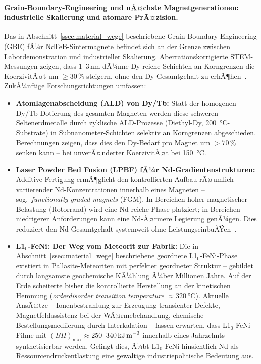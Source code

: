 ﻿\documentclass[12pt, a4paper]{report}
\theoremstyle{definition}
\theoremstyle{remark}
\begin{document}
\paragraph{Grain-Boundary-Engineering und nÃ¤chste Magnetgenerationen:
industrielle Skalierung und atomare PrÃ¤zision.}
Das in Abschnitt~\ref{ssec:material_wege} beschriebene
Grain-Boundary-Engineering (GBE) fÃ¼r NdFeB-Sintermagnete befindet sich
an der Grenze zwischen Labordemonstration und industrieller Skalierung.
Aberrationskorrigierte STEM-Messungen zeigen, dass $1$--$3\,\text{nm}$
dÃ¼nne Dy-reiche Schichten an Korngrenzen die KoerzivitÃ¤t um $\geq 30\,\%$
steigern, ohne den Dy-Gesamtgehalt zu erhÃ¶hen~\cite{sepehriamin2012}.
ZukÃ¼nftige Forschungsrichtungen umfassen:

\begin{itemize}
  \item \textbf{Atomlagenabscheidung (ALD) von Dy/Tb:}
    Statt der homogenen Dy/Tb-Dotierung des gesamten Magneten werden
    diese schweren Seltenerdmetalle durch zyklische
    ALD-Prozesse (Di\-ethyl-Dy, \SI{200}{\celsius}-Substrate) in Subnanometer-Schichten
    selektiv an Korngrenzen abgeschieden. Berechnungen zeigen, dass dies den
    Dy-Bedarf pro Magnet um $>70\,\%$ senken kann -- bei unverÃ¤nderter
    KoerzivitÃ¤t bei \SI{150}{\celsius}.

  \item \textbf{Laser Powder Bed Fusion (LPBF) fÃ¼r Nd-Gradientenstrukturen:}
    Additive Fertigung ermÃ¶glicht den kontrollierten Aufbau rÃ¤umlich
    variierender Nd-Konzentrationen innerhalb eines Magneten -- sog.\
    \emph{functionally graded magnets} (FGM). In Bereichen hoher
    magnetischer Belastung (Rotorrand) wird eine Nd-reiche Phase platziert;
    in Bereichen niedrigerer Anforderungen kann eine Nd-Ã¤rmere Legierung
    genÃ¼gen. Dies reduziert den Nd-Gesamtgehalt systemweit ohne
    LeistungseinbuÃŸen~\cite{nakamura2018}.

  \item \textbf{L1$_0$-FeNi: Der Weg vom Meteorit zur Fabrik:}
    Die in Abschnitt~\ref{ssec:material_wege} beschriebene
    geordnete L1$_0$-FeNi-Phase existiert in Pallasite-Meteoriten mit
    perfekter geordneter Struktur -- gebildet durch langsamste geochemische
    KÃ¼hlung Ã¼ber Millionen Jahre. Auf der Erde scheiterte bisher die
    kontrollierte Herstellung an der kinetischen Hemmung (\emph{orderdisorder
    transition temperature} $\approx \SI{320}{\celsius}$). Aktuelle AnsÃ¤tze --
    Ionenbestrahlung zur Erzeugung transienter Defekte, Magnetfeldassistenz
    bei der WÃ¤rmebehandlung, chemische Bestellungsmediierung durch Interkalation
    -- lassen erwarten, dass L1$_0$-FeNi-Filme mit $(BH)_{\max} \approx
    250$--$340\,\text{kJ\,m}^{-3}$ innerhalb eines Jahrzehnts synthetisierbar
    werden. Gelingt dies, Ã¼bt L1$_0$-FeNi hinsichtlich Nd als
    Ressourcendruckentlastung eine gewaltige industriepolitische Bedeutung aus.


\end{itemize}
\end{document}
